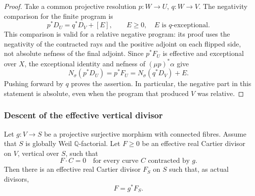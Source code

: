 \begin{proof}
Take a common projective resolution $p:W\to U$, $q:W\to V$.
The negativity comparison for the finite program is
\[
                p^*D_U=q^*D_V+[E],
 \qquad E\geq0,\quad E\text{ is }q\text{-exceptional}.
\]
This comparison is valid for a relative negative program: its proof
uses the negativity of the contracted rays and the positive adjoint on
each flipped side, not absolute nefness of the final adjoint.
Since $p^*F_U$ is effective and exceptional over $X$, the exceptional
identity and nefness of $(\mu p)^*\alpha$ give
\[
 N_\sigma(p^*D_U)=p^*F_U
                 =N_\sigma(q^*D_V)+E.
\]
Pushing forward by $q$ proves the assertion. In particular, the
negative part in this statement is absolute, even when the program
that produced $V$ was relative.
\end{proof}

\subsubsection{Descent of the effective vertical divisor}

\begin{lemma}
\label{repair:lem:negative-part-vertical-descent}
Let $g:V\to S$ be a projective surjective morphism with connected fibres.
Assume that $S$ is globally Weil $\mathbb{Q}$-factorial. Let $F\geq0$ be
an effective real Cartier divisor on $V$, vertical over $S$, such that
\[
                    F\cdot C=0
       \quad\text{for every curve }C\text{ contracted by }g.
\]
Then there is an effective real Cartier divisor $F_S$ on $S$ such that,
as actual divisors,
\[
                              F=g^*F_S.
\]
\end{lemma}

